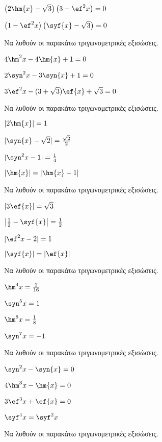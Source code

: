 \begin{multicols}{2}
\begin{rlist}
\item $ \left(2\hm{x}-\sqrt{3}\right)\left(3-\ef^2{x}\right)=0  $
\item $ \left( 1-\ef^2{x}\right)\left( \syf{x}-\sqrt{3}\right)=0  $
\end{rlist}
\Askhsh 
Να λυθούν οι παρακάτω τριγωνομετρικές εξισώσεις.
\begin{rlist}
\item $ 4\hm^2{x}-4\hm{x}+1=0 $
\item $ 2\syn^2{x}-3\syn{x}+1=0 $
\item $ 3\ef^2{x}-(3+\sqrt{3})\ef{x}+\sqrt{3}=0 $
\end{rlist}
\Askhsh 
Να λυθούν οι παρακάτω τριγωνομετρικές εξισώσεις.
\begin{rlist}
\item $ |2\hm{x}|=1 $
\item $ |\syn{x}-\sqrt{2}|=\frac{\sqrt{2}}{2} $
\item $ |\syn^2{x}-1|=\frac{1}{4} $
\item $ |\hm{x}|=|\hm{x}-1| $
\end{rlist}
\Askhsh 
Να λυθούν οι παρακάτω τριγωνομετρικές εξισώσεις.
\begin{rlist}
\item $ |3\ef{x}|=\sqrt{3} $
\item $ \left| \frac{1}{2}-\syf{x}\right| =\frac{1}{2} $
\item $ |\ef^2{x}-2|=1 $
\item $ |\syf{x}|=|\ef{x}| $
\end{rlist}
\Askhsh 
Να λυθούν οι παρακάτω τριγωνομετρικές εξισώσεις.
\begin{multicols}{2}
\begin{rlist}
\item $ \hm^4{x}=\frac{1}{16} $
\item $ \syn^5{x}=1 $
\item $ \hm^6{x}=\frac{1}{8} $
\item $ \syn^7{x}=-1 $
\end{rlist}
\end{multicols}
\Askhsh Να λυθούν οι παρακάτω τριγωνομετρικές εξισώσεις.
\begin{rlist}
\item $ \syn^2{x}-\syn{x}=0 $
\item $ 4\hm^3{x}-\hm{x}=0 $
\item $ 3\ef^3{x}+\ef{x}=0 $
\item $ \syf^4{x}=\syf^2{x} $
\end{rlist}
\Askhsh Να λυθούν οι παρακάτω τριγωνομετρικές εξισώσεις.

\end{multicols}
